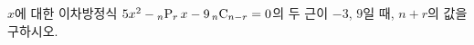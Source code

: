 $x$에 대한 이차방정식 $5x^2-{}_n\mathrm{P}_r\mkern3mu x-9\mkern3mu {}_n\mathrm{C}_{n-r}=0$의 두 근이 $-3$, $9$일 때, $n+r$의 값을 구하시오. 
